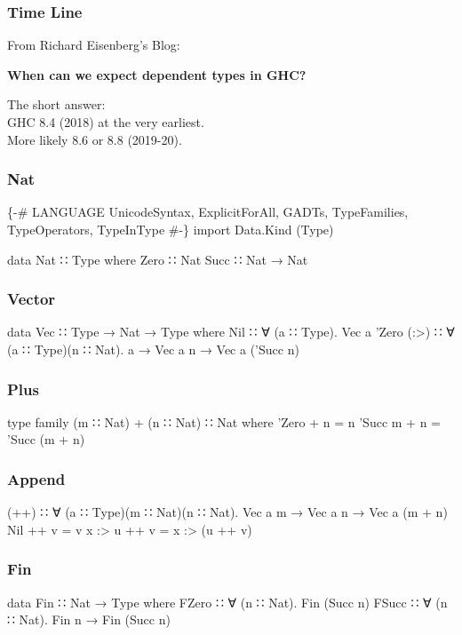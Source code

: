 \documentclass{beamer}
\begin{document}
\begin{frame}\frametitle{Time Line}
From Richard Eisenberg's Blog:

\bigskip

\textbf{When can we expect dependent types in GHC?}

\bigskip

The short answer:\\
GHC 8.4 (2018) at the very earliest.\\
More likely 8.6 or 8.8 (2019-20).
\end{frame}

\begin{frame}[fragile]\frametitle{Nat}
\begin{semiverbatim}
\{-# LANGUAGE UnicodeSyntax, ExplicitForAll, GADTs,
              TypeFamilies, TypeOperators, TypeInType #-\}
import Data.Kind (Type)

data Nat ∷ Type where
  Zero ∷ Nat
  Succ ∷ Nat → Nat
\end{semiverbatim}
\end{frame}

\begin{frame}[fragile]\frametitle{Vector}
\begin{semiverbatim}
data Vec ∷ Type → Nat → Type where
  Nil  ∷ ∀ (a ∷ Type). Vec a 'Zero
  (:>) ∷ ∀ (a ∷ Type)(n ∷ Nat).
    a → Vec a n → Vec a ('Succ n)
\end{semiverbatim}
\end{frame}

\begin{frame}[fragile]\frametitle{Plus}
\begin{semiverbatim}
type family (m ∷ Nat) + (n ∷ Nat) ∷ Nat where
  'Zero   + n = n
  'Succ m + n = 'Succ (m + n)
\end{semiverbatim}
\end{frame}

\begin{frame}[fragile]\frametitle{Append}
\begin{semiverbatim}
(++) ∷ ∀ (a ∷ Type)(m ∷ Nat)(n ∷ Nat).
       Vec a m → Vec a n → Vec a (m + n)
Nil    ++ v = v
x :> u ++ v = x :> (u ++ v)
\end{semiverbatim}
\end{frame}

\begin{frame}[fragile]\frametitle{Fin}
\begin{semiverbatim}
data Fin ∷ Nat → Type where
  FZero ∷ ∀ (n ∷ Nat).         Fin (Succ n)
  FSucc ∷ ∀ (n ∷ Nat). Fin n → Fin (Succ n)
\end{semiverbatim}
\end{frame}
\end{document}
